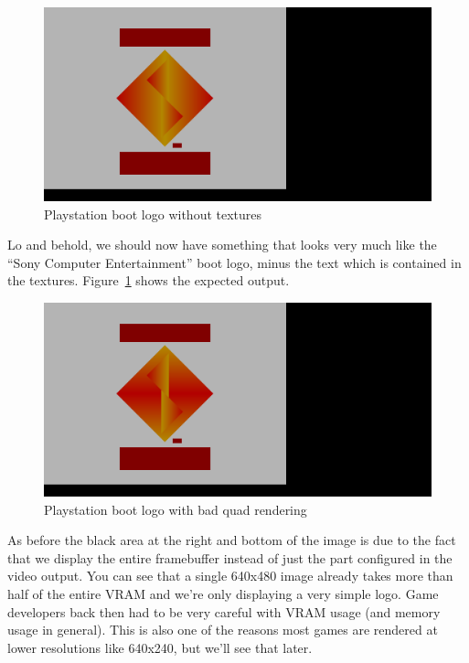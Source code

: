 \documentclass[a4paper]{article}
\begin{document}
\begin{figure}[ht]
  \centering
  \includegraphics[width=\textwidth]{images/logo-notextures}
  \caption{Playstation boot logo without textures}
  \label{fig:bootlogo_notextures}
\end{figure}

Lo and behold, we should now have something that looks very much like the
``Sony Computer Entertainment'' boot logo, minus the text which is
contained in the textures. Figure~\ref{fig:bootlogo_notextures} shows
the expected output.

\begin{figure}[ht]
  \centering
  \includegraphics[width=\textwidth]{images/logo-badquad}
  \caption{Playstation boot logo with bad quad rendering}
  \label{fig:bootlogo_badquad}
\end{figure}

As before the black area at the right and bottom of the image is due
to the fact that we display the entire framebuffer instead of just the
part configured in the video output. You can see that a single 640x480
image already takes more than half of the entire VRAM and we're only
displaying a very simple logo. Game developers back then had to be
very careful with VRAM usage (and memory usage in general). This is
also one of the reasons most games are rendered at lower resolutions
like 640x240, but we'll see that later.
\end{document}
